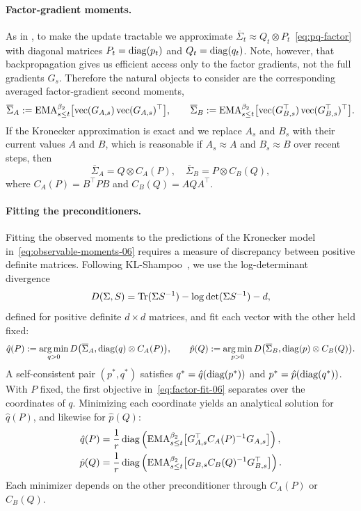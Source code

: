 \paragraph{Factor-gradient moments.}
As in , to make the update tractable we approximate $\overline \Sigma_t \approx Q_t \otimes P_t$~\eqref{eq:pq-factor} with diagonal matrices $P_t = \operatorname{diag}(p_t)$ and $Q_t = \operatorname{diag}(q_t)$. Note, however, that backpropagation gives us efficient access only to the factor gradients, not the full gradients $G_s$. Therefore the natural objects to consider are the corresponding averaged factor-gradient second moments,
\[
  \overline \Sigma_A:=\operatorname{EMA}^{\beta_2}_{s\le t}\bigl[\operatorname{vec}(G_{A,s})\operatorname{vec}(G_{A,s})^\top\bigr],
  \qquad
  \overline \Sigma_B:=\operatorname{EMA}^{\beta_2}_{s\le t}\bigl[\operatorname{vec}(G_{B,s}^\top)\operatorname{vec}(G_{B,s}^\top)^\top\bigr].
\]
If the Kronecker approximation is exact and we replace $A_s$ and $B_s$ with their current values $A$ and $B$, which is reasonable if $A_s \approx A$ and $B_s \approx B$ over recent steps, then
\begin{equation}\label{eq:observable-moments-06}
  \overline \Sigma_A
  = Q\otimes C_A(P),\quad
  \overline \Sigma_B
  = P\otimes C_B(Q),
\end{equation}
where $C_A(P)=B^\top P B$ and $C_B(Q)=A Q A^\top$.

\paragraph{Fitting the preconditioners.} Fitting the observed moments
to the predictions of the Kronecker model
in~\eqref{eq:observable-moments-06} requires a
measure of discrepancy between positive definite matrices. Following KL-Shampoo~\cite{klshampoo}, we use the
log-determinant divergence~\cite{logdetdiv}
\[
  D(\Sigma,S)=\operatorname{Tr}(\Sigma S^{-1})-\log\det(\Sigma S^{-1})-d,
\]
defined for positive definite $d\times d$ matrices, and fit each vector
with the other held fixed:
\begin{equation}\label{eq:factor-fit-06}
  \hat q(P):=\operatorname*{arg\,min}_{q>0}
    D\bigl(\overline \Sigma_A,\operatorname{diag}(q)\otimes C_A(P)\bigr),
  \qquad
  \hat p(Q):=\operatorname*{arg\,min}_{p>0}
    D\bigl(\overline \Sigma_B,\operatorname{diag}(p)\otimes C_B(Q)\bigr).
\end{equation}
A self-consistent pair $(p^*,q^*)$ satisfies $q^*=\hat q(\operatorname{diag}(p^*))$ and $p^*=\hat p(\operatorname{diag}(q^*))$. With $P$ fixed, the first objective in~\eqref{eq:factor-fit-06} separates over the coordinates of $q$. Minimizing each coordinate yields an analytical solution for $\hat q(P)$, and likewise for $\hat p(Q)$:
\begin{equation}\label{eq:conditional-minimizers-06}
\begin{aligned}
  \hat q(P)&=\frac1r\operatorname{diag}\left(\operatorname{EMA}^{\beta_2}_{s\le t}\bigl[G_{A,s}^\top C_A(P)^{-1}G_{A,s}\bigr]\right),\\
  \hat p(Q)&=\frac1r\operatorname{diag}\left(\operatorname{EMA}^{\beta_2}_{s\le t}\bigl[G_{B,s} C_B(Q)^{-1}G_{B,s}^\top\bigr]\right).
\end{aligned}
\end{equation}
Each minimizer depends on the other preconditioner through
$C_A(P)$ or $C_B(Q)$.

